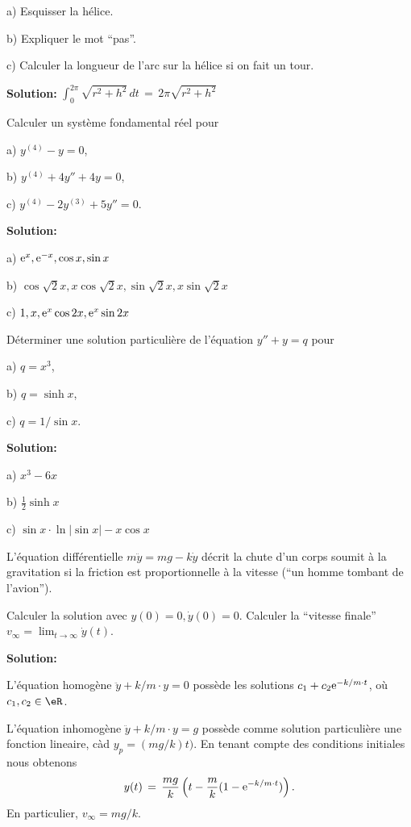 \medskip
a)
Esquisser la hélice.

\medskip
b)
Expliquer le mot ``pas''.


\medskip
c)
Calculer la longueur de l'arc sur la hélice si on fait un tour.

\medskip
{\bf Solution:}
$\int_0^{2\pi} \sqrt{r^2+h^2} \,dt \,=\, 2 \pi \sqrt{r^2+h^2}$


\bigskip
\exerNico
Calculer un système fondamental réel pour

\medskip
a) $y^{(4)}-y = 0$,

\medskip
b) $y^{(4)} +4y'' +4y = 0$,

\medskip
c) $y^{(4)} -2y^{(3)} +5y'' = 0$.


\bigskip
{\bf Solution:}

\medskip
a) ${\rm e}^x, {\rm e}^{-x}, \cos x, \sin x$

\medskip
b) $\cos \sqrt{2} x, x \cos \sqrt{2}x, \sin \sqrt{2}x, x \sin \sqrt{2}x$

\medskip
c)
$1, x, {\rm e}^x \cos 2x, {\rm e}^x \sin 2x$



\bigskip
\exerNico
Déterminer une solution particulière de l'équation
$y''+y=q$ pour

\medskip
a) $q = x^3$,

\medskip
b) $q = \sinh x$,

\medskip
c) $q = 1/\sin x$.


\bigskip
{\bf Solution:}

\medskip
a) $x^3 - 6 x$

\medskip
b) $\frac 12 \sinh x$

\medskip
c) $\sin x \cdot \ln |\sin x| - x \cos x$


\bigskip
\exerNico
L'équation différentielle $m \ddot y = mg - k\dot y$
décrit la chute d'un corps soumit
à la gravitation si la friction est proportionnelle à la vitesse (``un homme tombant de l'avion'').

\medskip
Calculer la solution avec $y(0) =0, \dot y(0) = 0$.
Calculer la ``vitesse finale'' $v_\infty = \displaystyle \lim_{t \to \infty} \dot y (t)$.



\bigskip
{\bf Solution:}

\medskip
L'équation homogène $\ddot y + k/m \cdot y = 0$
possède les solutions $c_1+c_2 {\rm e}^{-k/m \cdot t}$,
où $c_1, c_2 \in \eR$.

L'équation inhomogène $\ddot y + k/m \cdot y = g$
possède comme solution particulière une fonction lineaire, càd
$y_p = (mg/k)t)$.
En tenant compte des conditions initiales nous obtenons
$$
y(t) \,=\, \frac{mg}{k} \left( t-\frac mk (1-{\rm e}^{-k/m \cdot t})\right).
$$
En particulier, $v_\infty = mg/k$.






